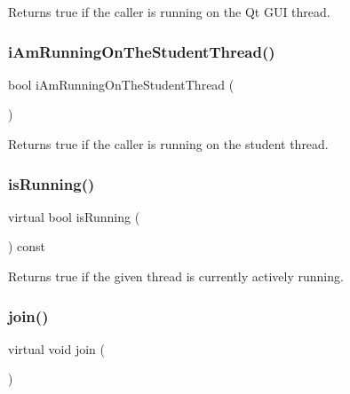Returns true if the caller is running on the Qt G\+UI thread. 

\mbox{\label{classGThread_a3e60d512067e765b4e2d7c0c5bec39fa}} 
\subsubsection{\texorpdfstring{i\+Am\+Running\+On\+The\+Student\+Thread()}{iAmRunningOnTheStudentThread()}}
{\footnotesize\ttfamily bool i\+Am\+Running\+On\+The\+Student\+Thread (\begin{DoxyParamCaption}{ }\end{DoxyParamCaption})\hspace{0.3cm}{\ttfamily [static]}}



Returns true if the caller is running on the student thread. 

\mbox{\label{classGThread_aff473089d979b1e6bab44a61504a0be9}} 
\subsubsection{\texorpdfstring{is\+Running()}{isRunning()}}
{\footnotesize\ttfamily virtual bool is\+Running (\begin{DoxyParamCaption}{ }\end{DoxyParamCaption}) const\hspace{0.3cm}{\ttfamily [pure virtual]}}



Returns true if the given thread is currently actively running. 

\mbox{\label{classGThread_a93870341d2cd3467df4f193375354be8}} 
\subsubsection{\texorpdfstring{join()}{join()}\hspace{0.1cm}{\footnotesize\ttfamily [1/2]}}
{\footnotesize\ttfamily virtual void join (\begin{DoxyParamCaption}{ }\end{DoxyParamCaption})\hspace{0.3cm}{\ttfamily [pure virtual]}}



